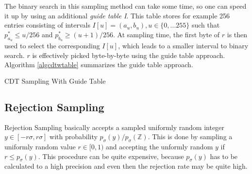 The binary search in this sampling method can take some time, so one can speed it up by using an additional \textit{guide table I}. This table stores for example 256 entries consisting of intervals $I[u] = (a_u, b_u), u \in \{0,...255\}$ such that $p^*_{a_{u}} \le u/256$ and $p^*_{b_{u}} \ge (u+1)/256$. At sampling time, the first byte of $r$ is then used to select the corresponding $I[u]$, which leads to a smaller interval to binary search. $r$ is effectively picked byte-by-byte using the guide table approach. Algorithm \ref{algcdtwtable} summarizes the guide table approach.
 \begin{algorithm}
 	\caption{CDT Sampling With Guide Table}
 	\label{algcdtwtable}
 	\begin{algorithmic}[1]
	 		\State
	 	\EndIf
				\State
				\Else
			\EndIf	
		\EndWhile
 	\end{algorithmic}
 \end{algorithm}
\subsection{Rejection Sampling}
Rejection Sampling basically accepts a sampled uniformly random integer $y \in [-r\sigma, r\sigma]$ with probability $p_\sigma(y)/p_\sigma(\mathbb{Z})$. This is done by sampling a uniformly random value $r \in [0,1)$ and accepting the unformly random $y$ if $r \le p_\sigma(y)$. This procedure can be quite expensive, because $p_\sigma(y)$ has to be calculated to a high precision and even then the rejection rate may be quite high.

